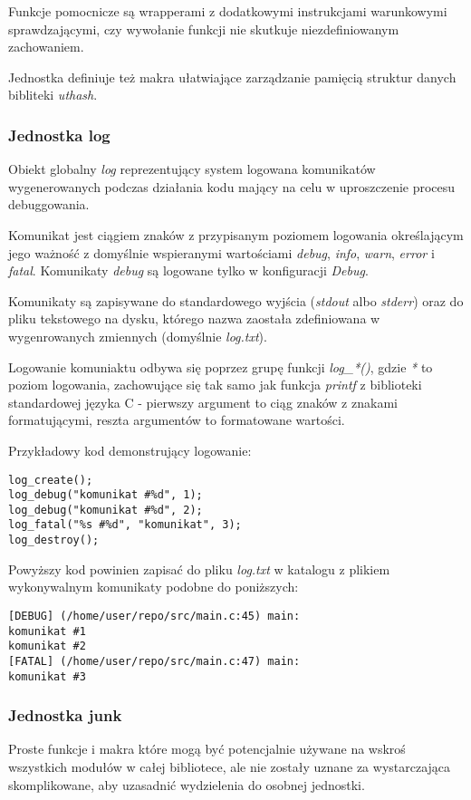 Funkcje pomocnicze są wrapperami z dodatkowymi instrukcjami warunkowymi sprawdzającymi, czy wywołanie funkcji nie skutkuje niezdefiniowanym zachowaniem.

Jednostka definiuje też makra ułatwiające zarządzanie pamięcią struktur danych bibliteki \textit{uthash}.


\subsubsection{Jednostka log}
Obiekt globalny \textit{log} reprezentujący system logowana komunikatów wygenerowanych podczas działania kodu mający na celu w uproszczenie procesu debuggowania.

Komunikat jest ciągiem znaków z przypisanym poziomem logowania określającym jego ważność z domyślnie wspieranymi wartościami \textit{debug}, \textit{info}, \textit{warn}, \textit{error} i \textit{fatal}.
Komunikaty \textit{debug} są logowane tylko w konfiguracji \textit{Debug}.

Komunikaty są zapisywane do standardowego wyjścia (\textit{stdout} albo \textit{stderr}) oraz do pliku tekstowego na dysku, którego nazwa zaostała zdefiniowana w wygenrowanych zmiennych (domyślnie \textit{log.txt}).

Logowanie komuniaktu odbywa się poprzez grupę funkcji \textit{log\_*()}, gdzie \textit{*} to poziom logowania, zachowujące się tak samo jak funkcja \textit{printf} z biblioteki standardowej języka C - pierwszy argument to ciąg znaków z znakami formatującymi, reszta argumentów to formatowane wartości.

Przykładowy kod demonstrujący logowanie:
\lstset{language=C}
\begin{lstlisting}
log_create();
log_debug("komunikat #%d", 1);
log_debug("komunikat #%d", 2);
log_fatal("%s #%d", "komunikat", 3);
log_destroy();
\end{lstlisting}

Powyższy kod powinien zapisać do pliku \textit{log.txt} w katalogu z plikiem wykonywalnym komunikaty podobne do poniższych:
\begin{verbatim}
[DEBUG] (/home/user/repo/src/main.c:45) main:
komunikat #1
komunikat #2
[FATAL] (/home/user/repo/src/main.c:47) main:
komunikat #3
\end{verbatim}

\subsubsection{Jednostka junk}
Proste funkcje i makra które mogą być potencjalnie używane na wskroś wszystkich modułów w całej bibliotece, ale nie zostały uznane za wystarczająca skomplikowane, aby uzasadnić wydzielenia do osobnej jednostki.

